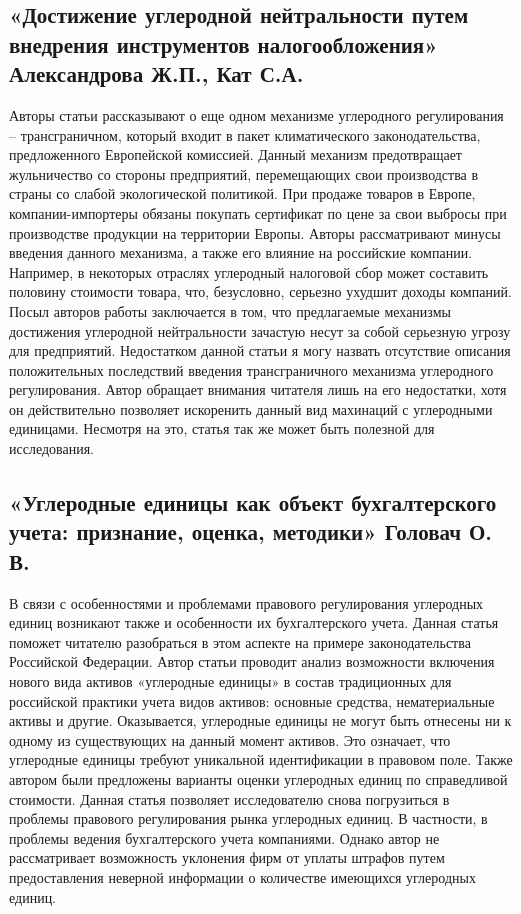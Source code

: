 \documentclass[a4paper,14pt]{article}
\begin{document}
    \subsection{«Достижение углеродной нейтральности путем внедрения инструментов налогообложения» Александрова Ж.П., Кат С.А.}
    Авторы статьи рассказывают о еще одном механизме углеродного регулирования – трансграничном, который входит в пакет климатического законодательства, предложенного Европейской комиссией. Данный механизм предотвращает жульничество со стороны предприятий, перемещающих свои производства в страны со слабой экологической политикой. При продаже товаров в Европе, компании-импортеры обязаны покупать сертификат по цене за свои выбросы при производстве продукции на территории Европы. Авторы рассматривают минусы введения данного механизма, а также его влияние на российские компании. Например, в некоторых отраслях углеродный налоговой сбор может составить половину стоимости товара, что, безусловно, серьезно ухудшит доходы компаний. Посыл авторов работы заключается в том, что предлагаемые механизмы достижения углеродной нейтральности зачастую несут за собой серьезную угрозу для предприятий. Недостатком данной статьи я могу назвать отсутствие описания положительных последствий введения трансграничного механизма углеродного регулирования. Автор обращает внимания читателя лишь на его недостатки, хотя он действительно позволяет искоренить данный вид махинаций с углеродными единицами. Несмотря на это, статья так же может быть полезной для исследования.
    \subsection{«Углеродные единицы как объект бухгалтерского учета: признание, оценка, методики» Головач О. В.}
    В связи с особенностями и проблемами правового регулирования углеродных единиц возникают также и особенности их бухгалтерского учета. Данная статья поможет читателю разобраться в этом аспекте на примере законодательства Российской Федерации. Автор статьи проводит анализ возможности включения нового вида активов «углеродные единицы»
в состав традиционных для российской практики учета видов активов: основные средства, нематериальные активы и другие. Оказывается, углеродные единицы не могут быть отнесены ни к одному из существующих на данный момент активов. Это означает, что углеродные единицы требуют уникальной идентификации в правовом поле. Также автором были предложены варианты оценки углеродных единиц по справедливой стоимости. Данная статья позволяет исследователю снова погрузиться в проблемы правового регулирования рынка углеродных единиц. В частности, в проблемы ведения бухгалтерского учета компаниями. Однако автор не рассматривает возможность уклонения фирм от уплаты штрафов путем предоставления неверной информации о количестве имеющихся углеродных единиц.
\end{document}
